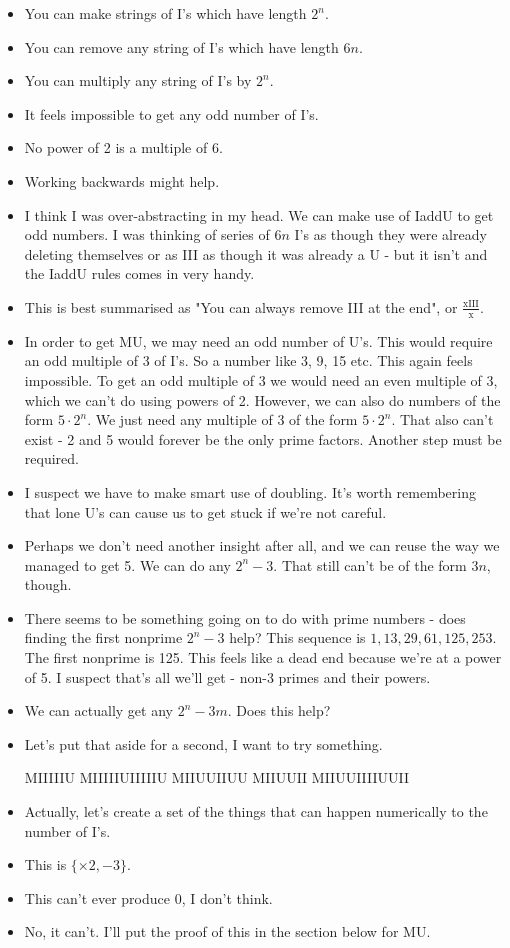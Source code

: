 \documentclass{article}
\begin{document}
\begin{itemize}
	\item You can make strings of I's which have length $2^n$.
	\item You can remove any string of I's which have length $6n$.
	\item You can multiply any string of I's by $2^n$.
	\item It feels impossible to get any odd number of I's.
	\item No power of 2 is a multiple of 6.
	\item Working backwards might help.
	\item I think I was over-abstracting in my head.
		We can make use of IaddU to get odd numbers.
		I was thinking of series of $6n$ I's as though they were
		already deleting themselves or as III as though it was
		already a U - but it isn't and the IaddU rules comes in
		very handy.
	\item This is best summarised as
		"You can always remove III at the end", or
		$\frac{\text{xIII}}{\text{x}}$.
	\item In order to get MU, we may need an odd number of U's.
		This would require an odd multiple of 3 of I's.
		So a number like 3, 9, 15 etc.
		This again feels impossible. To get an odd multiple of 3
		we would need an even multiple of 3, which we can't do
		using powers of 2.
		However, we can also do numbers of the form $5 \cdot 2^n$.
		We just need any multiple of 3 of the form $5 \cdot 2^n$.
		That also can't exist - 2 and 5 would forever be the only
		prime factors.
		Another step must be required.
	\item I suspect we have to make smart use of doubling.
		It's worth remembering that lone U's can cause us to get
		stuck if we're not careful.
	\item Perhaps we don't need another insight after all, and we
		can reuse the way we managed to get 5.
		We can do any $2^n-3$. That still can't be of the form
		$3n$, though.
	\item There seems to be something going on to do with prime
		numbers - does finding the first nonprime $2^n-3$ help?
		This sequence is $1, 13, 29, 61, 125, 253$.
		The first nonprime is 125. This feels like a dead end
		because we're at a power of 5. I suspect that's all we'll
		get - non-3 primes and their powers.
	\item We can actually get any $2^n-3m$. Does this help?
	\item Let's put that aside for a second, I want to try something.

		MIIIIIU MIIIIIUIIIIIU MIIUUIIUU MIIUUII MIIUUIIIIUUII
	\item Actually, let's create a set of the things that can
		happen numerically to the number of I's.
	\item This is ${\{\times 2, -3\}}$.
	\item This can't ever produce 0, I don't think.
	\item No, it can't. I'll put the proof of this in the section
		below for MU.

\end{itemize}
\end{document}
